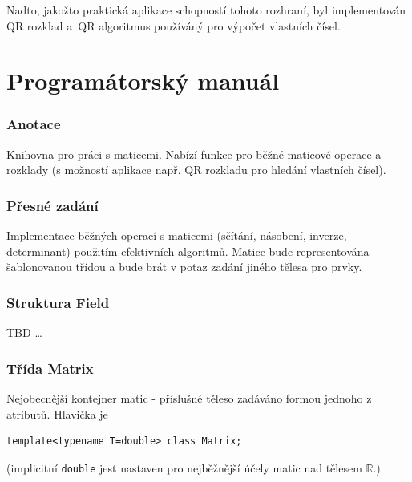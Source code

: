 \documentclass[11pt,a4paper]{article}
\begin{document}
Nadto, jakožto praktická aplikace schopností tohoto rozhraní, byl implementován
QR rozklad a~QR algoritmus používáný pro výpočet vlastních čísel.

\pagebreak

\part{Programátorský manuál}
\section{Anotace}
Knihovna pro práci s maticemi.
Nabízí funkce pro běžné maticové operace a rozklady (s možností aplikace např.
QR rozkladu pro hledání vlastních čísel).

\section{Přesné zadání}
Implementace běžných operací s maticemi (sčítání, násobení, inverze,
determinant) použitím efektivních algoritmů. 
Matice bude representována šablonovanou třídou a bude brát v potaz zadání
jiného tělesa pro prvky.

\section{Struktura Field}

TBD \ldots

\section{Třída Matrix}

Nejobecnější kontejner matic - příslušné těleso zadáváno formou jednoho z
atributů.
Hlavička je
\begin{verbatim}
template<typename T=double> class Matrix;
\end{verbatim}
(implicitní \verb=double= jest nastaven pro nejběžnější účely matic nad tělesem
$\mathbb{R}$.)

\renewcommand{\labelitemi}{$\clubsuit$}
\renewcommand{\labelitemii}{$\heartsuit$}
\renewcommand{\labelitemiii}{$\spadesuit$}
\end{document}
